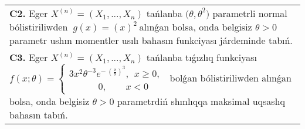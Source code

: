 \documentclass{article}
\begin{document}
\begin{tabular}{m{17cm}}
 \\
\textbf{C2.} 
Eger \(X^{(n)} = \left( X_{1},...,X_{n} \right)\) tańlanba \({(\theta,\theta}^{2})\) parametrli normal bólistiriliwden \({\ g(x) = (x)}^{2}\ \)alınǵan bolsa, onda belgisiz \(\theta > 0\) parametr ushın momentler usılı bahasın funkciyası járdeminde tabıń.
 \\
\textbf{C3.} 
Eger \(X^{(n)} = \left( X_{1},...,X_{n} \right)\) tańlanba tıǵızlıq funkciyası
$f(x;\theta) = \left\{ \begin{matrix}
3x^{2}\theta^{- 3}e^{- \ \left( \frac{x}{\theta} \right)^{3}},\ \ x \geq 0, \\
\ \ \ \ \ \ \ \ \ \ \ \ \ \ 0,\ \ \ \ \ \ \ \ \ x < 0
\end{matrix} \right.\ $
bolǵan bólistiriliwden alınǵan bolsa, onda belgisiz \(\theta > 0\) parametrdiń shınlıqqa maksimal uqsaslıq bahasın tabıń.
 \\

\end{tabular}
\vspace{1cm}
\end{document}
